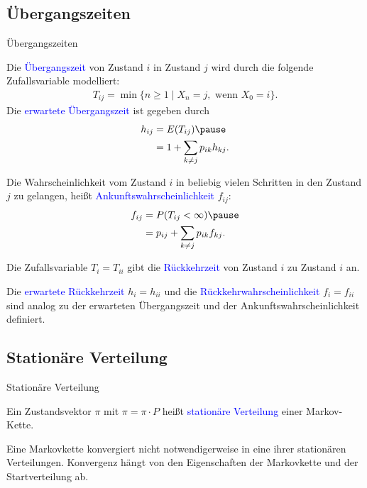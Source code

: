 \documentclass{beamer}
\def\padding{\vspace{0.5cm}}
\def\spadding{\vspace{0.25cm}}
\def\b{\textcolor{blue}}
\begin{document}
\subsection{Übergangszeiten}
\begin{frame}{Übergangszeiten}
    \begin{definition}
        Die \b{Übergangszeit} von Zustand $i$ in Zustand $j$ wird durch die folgende Zufallsvariable modelliert:
        \begin{align*}
            T_{ij} = \min \{n \geq 1 \mid X_n = j, \text{ wenn } X_0 = i\}.
        \end{align*}\pause
        Die \b{erwartete Übergangszeit} ist gegeben durch
        \begin{align*}
            h_{ij} &= E(T_{ij})\pause \\
                   &= 1 + \sum_{k \neq j} p_{ik} h_{kj}.
        \end{align*}
    \end{definition}
\end{frame}

\begin{frame}
    Die Wahrscheinlichkeit vom Zustand $i$ in beliebig vielen Schritten in den Zustand $j$ zu gelangen, heißt \b{Ankunftswahrscheinlichkeit} $f_{ij}$:
    \begin{align*}
        f_{ij} &= P(T_{ij} < \infty)\pause \\
               &= p_{ij} + \sum_{k \neq j} p_{ik} f_{kj}.
    \end{align*}\pause
    \begin{definition}
        Die Zufallsvariable $T_i = T_{ii}$ gibt die \b{Rückkehrzeit} von Zustand $i$ zu Zustand $i$ an.\pause\par\spadding
        Die \b{erwartete Rückkehrzeit} $h_i = h_{ii}$ und die \b{Rückkehrwahrscheinlichkeit} $f_i = f_{ii}$ sind analog zu der erwarteten Übergangszeit und der Ankunftswahrscheinlichkeit definiert.
    \end{definition}
\end{frame}

\subsection{Stationäre Verteilung}
\begin{frame}{Stationäre Verteilung}
    \begin{definition}
        Ein Zustandsvektor $\pi$ mit $\pi = \pi \cdot P$ heißt \b{stationäre Verteilung} einer Markov-Kette.
    \end{definition}\par\pause\padding
    Eine Markovkette konvergiert nicht notwendigerweise in eine ihrer stationären Verteilungen. Konvergenz hängt von den Eigenschaften der Markovkette und der Startverteilung ab.
\end{frame}
\end{document}
